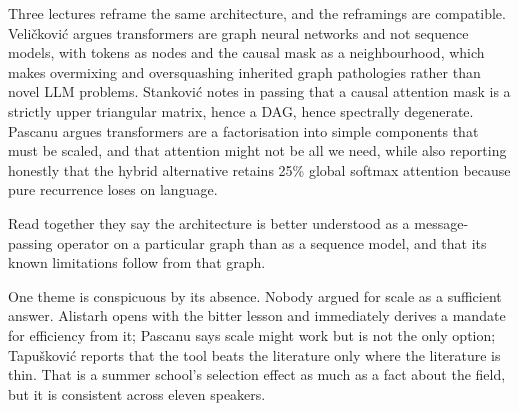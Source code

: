 Three lectures reframe the same architecture, and the reframings are compatible.
Veli\v{c}kovi\'{c} argues transformers are graph neural networks and not sequence models, with tokens
as nodes and the causal mask as a neighbourhood, which makes overmixing and oversquashing inherited
graph pathologies rather than novel LLM problems. Stankovi\'{c} notes in passing that a causal
attention mask is a strictly upper triangular matrix, hence a DAG, hence spectrally degenerate.
Pascanu argues transformers are a factorisation into simple components that must be scaled, and that
attention might not be all we need, while also reporting honestly that the hybrid alternative
retains 25\% global softmax attention because pure recurrence loses on language.

Read together they say the architecture is better understood as a message-passing operator on a
particular graph than as a sequence model, and that its known limitations follow from that graph.

\begin{aside}
One theme is conspicuous by its absence. Nobody argued for scale as a sufficient answer. Alistarh
opens with the bitter lesson and immediately derives a mandate for efficiency from it; Pascanu says
scale might work but is not the only option; Tapu\v{s}kovi\'{c} reports that the tool beats the
literature only where the literature is thin. That is a summer school's selection effect as much as a fact
about the field, but it is consistent across eleven speakers.
\end{aside}
